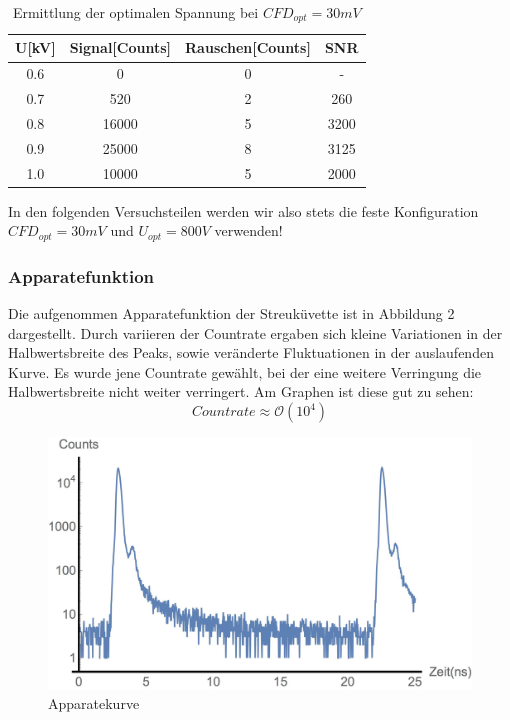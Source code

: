 \documentclass{article}
\begin{document}
\begin{table}[h]
  \centering
  \begin{tabular}{c|c|c|c}
    U[kV] & Signal[Counts] & Rauschen[Counts] & SNR \\
    \hline
    0.6   &     0          & 0                & -\\
    0.7   &    520         & 2                & 260\\
    0.8   &  16000         & 5                & 3200\\
    0.9   &     25000      & 8                & 3125\\
    1.0   &     10000      & 5                & 2000\\
  \end{tabular}
  \caption{Ermittlung der optimalen Spannung bei $CFD_{opt}=30mV$}
\end{table}

In den folgenden Versuchsteilen werden wir also stets die feste Konfiguration $CFD_{opt}=30mV$ und $ U_{opt}=800V$ verwenden!

\subsubsection{Apparatefunktion}
Die aufgenommen Apparatefunktion der Streuküvette ist in Abbildung 2 dargestellt. Durch variieren der Countrate ergaben sich
kleine Variationen in der Halbwertsbreite des Peaks, sowie veränderte Fluktuationen in der auslaufenden Kurve. Es wurde jene Countrate
gewählt, bei der eine weitere Verringung die Halbwertsbreite nicht weiter verringert. Am Graphen ist diese gut zu sehen:
$$Countrate \approx \mathcal{O}(10^4)$$

\begin{figure}[h]
  \centering
  \includegraphics[width=\textwidth]{Bilder/apparatekurve.jpg}
  \caption{Apparatekurve}
\end{figure}
\end{document}
